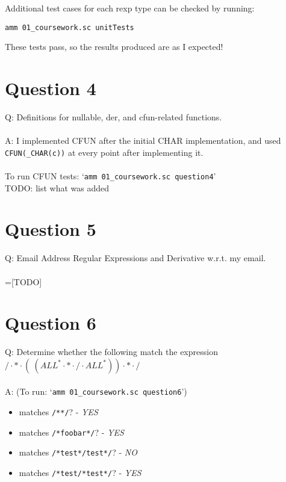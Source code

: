 \documentclass[english]{scrartcl}
\begin{document}
Additional test cases for each rexp type can be checked by running:
\begin{center}
    \verb|amm 01_coursework.sc unitTests|
\end{center}

These tests pass, so the results produced are as I expected!

\section*{Question 4}
Q: Definitions for nullable, der, and cfun-related functions.
\\
\\
A: I implemented CFUN after the initial CHAR implementation, and used \verb|CFUN(_CHAR(c))| at every point after implementing it.\\
\\
To run CFUN tests: `\verb|amm 01_coursework.sc question4|' \\
TODO: list what was added

\section*{Question 5}
Q: Email Address Regular Expressions and Derivative w.r.t. my email.
\\
\\
=[TODO]

\section*{Question 6}
Q: Determine whether the following match the expression
$ / \cdot * \cdot (~(ALL^* \cdot * \cdot / \cdot ALL^*)) \cdot * \cdot /$
\\
\\
A: (To run: `\verb|amm 01_coursework.sc question6|') \\
\begin{itemize}
    \item matches \verb|/**/|? - \textit{YES}
    \item matches \verb|/*foobar*/|? - \textit{YES}
    \item matches \verb|/*test*/test*/|? - \textit{NO}
    \item matches \verb|/*test/*test*/|? - \textit{YES}

\end{itemize}
\end{document}
